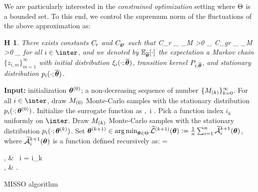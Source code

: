 \documentclass[11pt]{article}
\makeatletter
\newtheorem{assumption}{H\!\!}
\theoremstyle{t}
\DeclareRobustCommand*\cal{\@fontswitch\relax\mathcal}
\makeatother
\begin{document}
We are particularly interested in the \emph{constrained optimization} setting where $\Theta$ is a bounded set. 
To this end, we control the supremum norm of the fluctuations of the above approximation as: 
\begin{assumption}\label{controlapprox}
There exists constants $C_{\sf r}$ and $C_{\sf gr}$ such that 
\beq
C_{\sf r} \geq \sup \limits_{\op \in \Param} \sup \limits_{M >0}  \EE_{\op}\left[ \sup \limits_{\param \in \Param} \left| \sum_{m=1}^{M}{ \left\{ r_i (\param ; \op, z_{i,m})  - \sur{i}{\param}{\op} \right\} } \right| \right] 
\eeq
\beq
C_{\sf gr} \geq \sup \limits_{\op \in \Param} \sup \limits_{M >0}  \EE_{\op}\left[ \sup \limits_{\param \in \Param} \left| \frac{1}{{M}} \sum_{m=1}^{M}{ \left\{ \frac{
-r_i' (\param, \param - \op ; \op,  z_{i,m} ) + \widehat{\cal L}_i'( \param , \param - \op; \op )}{\| \op - \param\|} \right\} }\right|^2 \right] 
\eeq
for all $i \in \inter$,  and 
we denoted by $\mathbb{E}_{\overline{{\bm{\theta}}}} [\cdot]$ the expectation \wrt a Markov chain $\{z_{i,m}\}_{m=1}^{\infty}$ with  initial distribution $\xi_{i} (\cdot; \overline{{\bm{\theta}}})$, transition kernel $P_{i,\overline{{\bm{\theta}}}}$, and stationary distribution $p_{i}(\cdot; \overline{{\bm{\theta}}})$.
\end{assumption} 


\begin{algorithm}[t]
\begin{algorithmic}[1]
\STATE \textbf{Input:} initialization ${{\bm{\theta}}}^{(0)}$; a non-decreasing sequence of number $\{ M_{(k)} \}_{k=0}^\infty$.
\STATE For all $i \in \inter$, draw $M_{(0)}$ Monte-Carlo samples with the stationary distribution $p_i(\cdot; {{\bm{\theta}}}^{(0)})$.
\STATE Initialize the surrogate function as
\beq
{} \eqdef {},~i \in \inter. \vspace{-.2cm}
\eeq
{}
\STATE Pick a function index $i_k$ uniformly on $\inter$.
\STATE Draw $M_{(k)}$ Monte-Carlo samples with the stationary distribution $p_i(\cdot; {{\bm{\theta}}}^{(k)})$.
\STATE Set $\hp{k+1} \in \argmin_{ \param \in \Param } \sumSur{k+1}{\param} \eqdef  \frac{1}{n} \sum_{i=1}^n \tafct{i}{k+1}{\param}$, where $\tafct{i}{k+1}{\param}$ is a function defined recursively as:
\beq
{} = \begin{cases}
, & ~i = i_k \\
, & .
\end{cases}
\eeq
\ENDFOR
\end{algorithmic}
\caption{MISSO algorithm}
\label{alg:misso}
        \end{algorithm}
\end{document}
